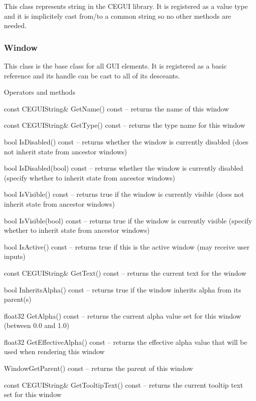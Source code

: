 This class represents string in the CEGUI library. It is registered as a value type and it is implicitely cast from/to a common string so no other methods are needed.

\subsubsection{Window}

This class is the base class for all GUI elements. It is registered as a basic reference and its handle can be cast to all of its desceants.

\begin{titled-itemize}{Operators and methods}
  \item const CEGUIString\& GetName() const -- returns the name of this window
  \item const CEGUIString\& GetType() const -- returns the type name for this window
  \item bool IsDisabled() const -- returns whether the window is currently disabled (does not inherit state from ancestor windows)
  \item bool IsDisabled(bool) const -- returns whether the window is currently disabled (specify whether to inherit state from ancestor windows)
  \item bool IsVisible() const -- returns true if the window is currently visible (does not inherit state from ancestor windows)
  \item bool IsVisible(bool) const -- returns true if the window is currently visible (specify whether to inherit state from ancestor windows)
  \item bool IsActive() const -- returns true if this is the active window (may receive user inputs)
  \item const CEGUIString\& GetText() const -- returns the current text for the window
  \item bool InheritsAlpha() const -- returns true if the window inherits alpha from its parent(s)
  \item float32 GetAlpha() const -- returns the current alpha value set for this window (between 0.0 and 1.0)
  \item float32 GetEffectiveAlpha() const -- returns the effective alpha value that will be used when rendering this
 window
  \item Window\@ GetParent() const -- returns the parent of this window
  \item const CEGUIString\& GetTooltipText() const -- returns the current tooltip text set for this window

\end{titled-itemize}
